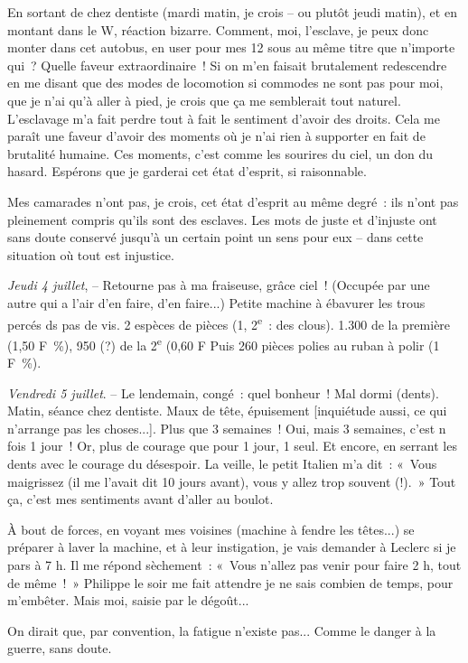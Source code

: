 \documentclass[french,twoside]{book} %
\begin{document}
En sortant de chez dentiste (mardi matin, je crois – ou plutôt jeudi matin), et en montant dans le W, réaction bizarre. Comment, moi, l'esclave, je peux donc monter dans cet autobus, en user pour mes 12 sous au même titre que n'importe qui ? Quelle faveur extraordinaire ! Si on m'en faisait brutalement redescendre en me disant que des modes de locomotion si commodes ne sont pas pour moi, que je n'ai qu'à aller à pied, je crois que ça me semblerait tout naturel. L'esclavage m'a fait perdre tout à fait le sentiment d'avoir des droits. Cela me paraît une faveur d'avoir des moments où je n'ai rien à supporter en fait de brutalité humaine. Ces moments, c'est comme les sourires du ciel, un don du hasard. Espérons que je garderai cet état d'esprit, si raisonnable.\par
Mes camarades n'ont pas, je crois, cet état d'esprit au même degré : ils n'ont pas pleinement compris qu'ils sont des esclaves. Les mots de juste et d'injuste ont sans doute conservé jusqu'à un certain point un sens pour eux – dans cette situation où tout est injustice.\par
{\itshape Jeudi 4 juillet}, – Retourne pas à ma fraiseuse, grâce ciel ! (Occupée par une autre qui a l'air d'en faire, d'en faire...) Petite machine à ébavurer les trous percés ds pas de vis. 2 espèces de pièces (1, 2\textsuperscript{e} : des clous). 1.300 de la première (1,50 F \%), 950 (?) de la 2\textsuperscript{e} (0,60 F Puis 260 pièces polies au ruban à polir (1 F \%).\par
{\itshape Vendredi 5 juillet}. – Le lendemain, congé : quel bonheur ! Mal dormi (dents). Matin, séance chez dentiste. Maux de tête, épuisement [inquiétude aussi, ce qui n'arrange pas les choses...]. Plus que 3 semaines ! Oui, mais 3 semaines, c'est n fois 1 jour ! Or, plus de courage que pour 1 jour, 1 seul. Et encore, en serrant les dents avec le courage du désespoir. La veille, le petit Italien m'a dit : « Vous maigrissez (il me l'avait dit 10 jours avant), vous y allez trop souvent (!). » Tout ça, c'est mes sentiments avant d'aller au boulot.\par
À bout de forces, en voyant mes voisines (machine à fendre les têtes...) se préparer à laver la machine, et à leur instigation, je vais demander à Leclerc si je pars à 7 h. Il me répond sèchement : « Vous n'allez pas venir pour faire 2 h, tout de même ! » Philippe le soir me fait attendre je ne sais combien de temps, pour m'embêter. Mais moi, saisie par le dégoût...\par
On dirait que, par convention, la fatigue n'existe pas... Comme le danger à la guerre, sans doute.\par
\end{document}
